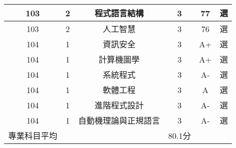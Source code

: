 \documentclass[10pt,a4paper]{altacv}
\begin{document}
\begin{center}
\begin{tabular}{|c|c|c|c|c|c|}
103    & 2  & 程式語言結構     & 3     & 77 & 選   \\ \hline
103    & 2  & 人工智慧       & 3     & 76 & 選   \\ \hline
104    & 1  & 資訊安全       & 3     & A+ & 選   \\ \hline
104    & 1  & 計算機圖學      & 3     & A+ & 選   \\ \hline
104    & 1  & 系統程式       & 3     & A- & 選   \\ \hline
104    & 1  & 軟體工程       & 3     & A  & 選   \\ \hline
104    & 1  & 進階程式設計     & 3     & A- & 選   \\ \hline
104    & 1  & 自動機理論與正規語言 & 3     & A- & 選   \\ \hline
專業科目平均 &    &            & 80.1分 &    &     \\ \hline
\end{tabular}
\end{center}
\end{document}
